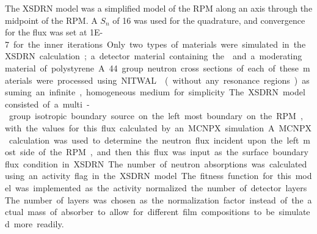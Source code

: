 The XSDRN model was a simplified model of the RPM along an axis through the midpoint of the RPM.
A $S_n$ of 16 was used for the quadrature, and convergence for the flux was set at \SI{1E-7} for the inner iterations.
Only two types of materials were simulated in the XSDRN calculation; a detector material containing the  and a moderating material of polystyrene.
A 44 group neutron cross sections of each of these materials were processed using NITWAL \cite{NITAWL_2011} (without any resonance regions) assuming an infinite, homogeneous medium for simplicity.
The XSDRN model consisted of a multi-group isotropic boundary source on the left most boundary on the RPM, with the values for this flux calculated by an MCNPX simulation.
A MCNPX calculation was used to determine the neutron flux incident upon the left most side of the RPM, and then this flux was input as the surface boundary flux condition in XSDRN.
The number of neutron absorptions was calculated using an activity flag in the XSDRN model.
The fitness function for this model was implemented as the activity normalized the number of detector layers.
The number of layers was chosen as the normalization factor instead of the actual mass of absorber to allow for different film compositions to be simulated more readily.
